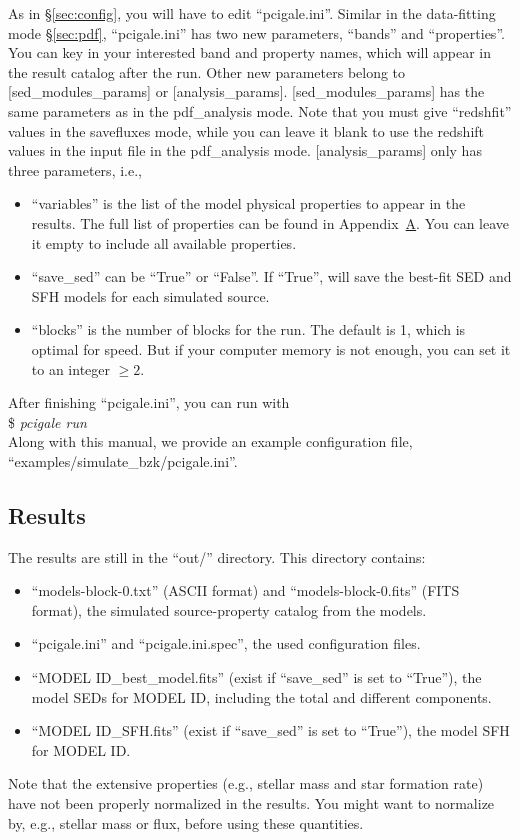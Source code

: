 As in \S\ref{sec:config}, you will have to edit ``pcigale.ini''. 
Similar in the data-fitting mode \S\ref{sec:pdf}, ``pcigale.ini'' has two new parameters, 
``bands'' and ``properties''.
You can key in your interested band and property names, which will appear in the result catalog after the run.
Other new parameters belong to [sed\_modules\_params] or [analysis\_params]. 
[sed\_modules\_params] has the same parameters as in the pdf\_analysis mode. 
Note that you must give ``redshfit'' values in the savefluxes mode, while you can leave it blank to use the redshift values in the input file in the pdf\_analysis mode.
[analysis\_params] only has three parameters, i.e.,
\begin{itemize}
    \item ``variables'' is the list of the model physical properties to appear in the results. 
    The full list of properties can be found in Appendix~\hyperref[app:par]{A}.
    You can leave it empty to include all available properties.
    \item ``save\_sed'' can be ``True'' or ``False''. 
    If ``True'', will save the best-fit SED and SFH models for each simulated source. 
    \item ``blocks'' is the number of blocks for the run.
    The default is 1, which is optimal for speed. 
    But if your computer memory is not enough, you can set it to an integer $\geq 2$. 
\end{itemize}

After finishing ``pcigale.ini'', you can run with \\
\$ \textit{pcigale run} \\
Along with this manual, we provide an example configuration file, ``examples/simulate\_bzk/pcigale.ini''.

\subsection{Results}
The results are still in the ``out/'' directory. 
This directory contains:
\begin{itemize}
    \item ``models-block-0.txt'' (ASCII format) and ``models-block-0.fits'' (FITS format), the simulated source-property catalog from the models.
    \item ``pcigale.ini'' and ``pcigale.ini.spec'', the used configuration files. 
    \item ``{MODEL ID}\_best\_model.fits'' (exist if ``save\_sed'' is set to ``True''), the model SEDs for {MODEL ID}, including the total and different components. 
    \item ``{MODEL ID}\_SFH.fits'' (exist if ``save\_sed'' is set to ``True''), the model SFH for {MODEL ID}.
\end{itemize}
Note that the extensive properties (e.g., stellar mass and star formation rate) have not been properly normalized in the results. 
You might want to normalize by, e.g., stellar mass or flux, before using these quantities. 

